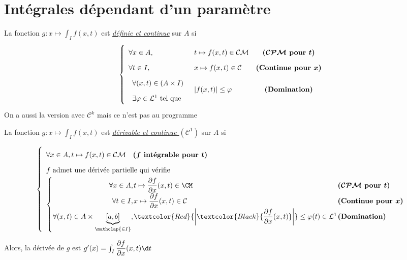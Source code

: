 \documentclass[11pt,a4paper,fleqn,pdftex]{report}
\begin{document}
\section{Intégrales dépendant d'un paramètre}
\begin{theorem}[Continuité]
La fonction $g : x \mapsto \int_I f(x,t)$ est \uline{\emph{définie et continue}} sur $A$ si 
\begin{equation}\left\lbrace
\begin{array}{l l c}
\forall x\in A,& t \mapsto f(x,t) \in \mathcal{CM}&\boldsymbol{( \mathcal{CPM} }\text{\textbf{ pour }}\boldsymbol{t)}\\
\forall t\in I,& x \mapsto f(x,t) \in \mathcal{C}&\text{\textbf{(Continue pour }}\boldsymbol{x)}\\
\begin{array}{r}
	\forall (x,t) \in (A\times I)\\
	\exists \varphi \in \mathcal{L}^{1}\text{ tel que } \\
\end{array}& |f(x,t)|\le \varphi&\text{\textbf{(Domination)}}\\
\end{array}
\right.
\end{equation}
On a aussi la version avec $\mathcal{C}^{k}$ mais ce n'est pas au programme
\end{theorem}
\begin{itheorem}[Dérivabilité]
La fonction $g : x \mapsto \int_I f(x,t)$ est \uline{\emph{dérivable et continue $\left( \mathcal{C}^1 \right)$}} sur $A$ si 

\[
\left\lbrace
\begin{array}{l}
\forall x\in A, t \mapsto f(x,t) \in \mathcal{CM}\quad \boldsymbol{(f} \text{\textbf{ intégrable pour }}\boldsymbol{t)}\\
f \text{ admet une dérivée partielle qui vérifie} \\
\left\lbrace
\arraycolsep=0.5pt\def\arraystretch{1.8}
\begin{array}{r l l}
\forall x \in A,& t\mapsto \dfrac{\partial f}{\partial x}(x,t) \in \CM &\boldsymbol{( \mathcal{CPM} }\text{\textbf{ pour }}\boldsymbol{t)}\\
\forall t\in I,& x\mapsto \dfrac{\partial f}{\partial x}(x,t) \in \mathcal{C} &\text{\textbf{(Continue pour }}\boldsymbol{x)}\\
\forall (x,t) \in A \times \underbrace{[a,b]}_{\mathclap{\in I}},& \textcolor{Red}{\left|\textcolor{Black}{\dfrac{\partial f}{\partial x}(x,t)}\right|} \le \varphi(t) \in \mathcal{L}^1 & \text{\textbf{(Domination)}}
\end{array}
\right.
\end{array}
\right.
\]

Alors, la dérivée de $g$ est $g'(x) = \int_I \dfrac{\partial f}{\partial x}(x,t) \d t$
\end{itheorem}
\end{document}
